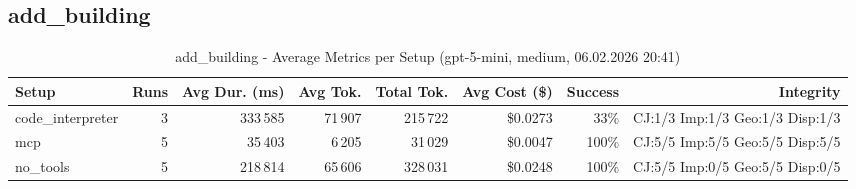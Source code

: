 \documentclass[a4paper,11pt]{article}
\begin{document}
\clearpage

\subsection{add\_building}

\begin{table}[H]
\centering
\scriptsize
\caption{add\_building - Average Metrics per Setup (gpt-5-mini, medium, 06.02.2026 20:41)}
\label{tab:combined\_add\_building\_metrics\_20260206}
\begin{tabular}{l r r r r r r r}
\toprule
Setup & Runs & Avg Dur. (ms) & Avg Tok. & Total Tok. & Avg Cost (\$) & Success & Integrity \\
\midrule
code\_interpreter & 3 & 333\,585 & 71\,907 & 215\,722 & \$0.0273 & 33\% & CJ:1/3 Imp:1/3 Geo:1/3 Disp:1/3 \\
mcp & 5 & 35\,403 & 6\,205 & 31\,029 & \$0.0047 & 100\% & CJ:5/5 Imp:5/5 Geo:5/5 Disp:5/5 \\
no\_tools & 5 & 218\,814 & 65\,606 & 328\,031 & \$0.0248 & 100\% & CJ:5/5 Imp:0/5 Geo:5/5 Disp:0/5 \\
\bottomrule
\end{tabular}
\end{table}
\end{document}
